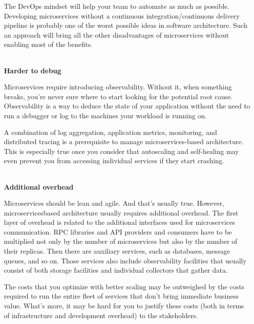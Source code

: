 The DevOps mindset will help your team to automate as much as possible. Developing microservices without a continuous integration/continuous delivery pipeline is probably one of the worst possible ideas in software architecture. Such an approach will bring all the other disadvantages of microservices without enabling most of the benefits.

\hspace*{\fill} \\ %
\noindent
\textbf{Harder to debug}

Microservices require introducing observability. Without it, when something breaks, you're never sure where to start looking for the potential root cause. Observability is a way to deduce the state of your application without the need to run a debugger or log to the machines your workload is running on.

A combination of log aggregation, application metrics, monitoring, and distributed tracing is a prerequisite to manage microservices-based architecture. This is especially true once you consider that autoscaling and self-healing may even prevent you from accessing individual services if they start crashing.

\hspace*{\fill} \\ %
\noindent
\textbf{Additional overhead}

Microservices should be lean and agile. And that's usually true. However, microservicesbased architecture usually requires additional overhead. The first layer of overhead is related to the additional interfaces used for microservices communication. RPC libraries and API providers and consumers have to be multiplied not only by the number of microservices but also by the number of their replicas. Then there are auxiliary services, such as databases, message queues, and so on. Those services also include observability facilities that usually consist of both storage facilities and individual collectors that gather data.

The costs that you optimize with better scaling may be outweighed by the costs required to run the entire fleet of services that don't bring immediate business value. What's more, it may be hard for you to justify these costs (both in terms of infrastructure and development overhead) to the stakeholders.


